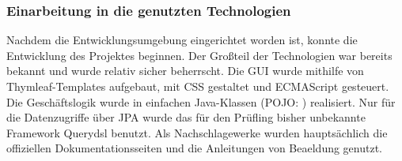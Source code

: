 \subsubsection{Einarbeitung in die genutzten Technologien}
\label{sec:Technologien}
Nachdem die Entwicklungsumgebung eingerichtet worden ist, konnte die Entwicklung des Projektes beginnen. Der Großteil der Technologien war bereits bekannt und wurde relativ sicher beherrscht. Die \ac{GUI} wurde mithilfe von Thymleaf-Templates aufgebaut, mit CSS gestaltet und ECMAScript gesteuert. Die Geschäftslogik wurde in einfachen Java-Klassen (\acs{POJO}: ) realisiert. Nur für die Datenzugriffe über \ac{JPA} wurde das für den Prüfling bisher unbekannte Framework Querydsl benutzt. Als Nachschlagewerke wurden hauptsächlich die offiziellen Dokumentationsseiten und die Anleitungen von Beaeldung genutzt.

